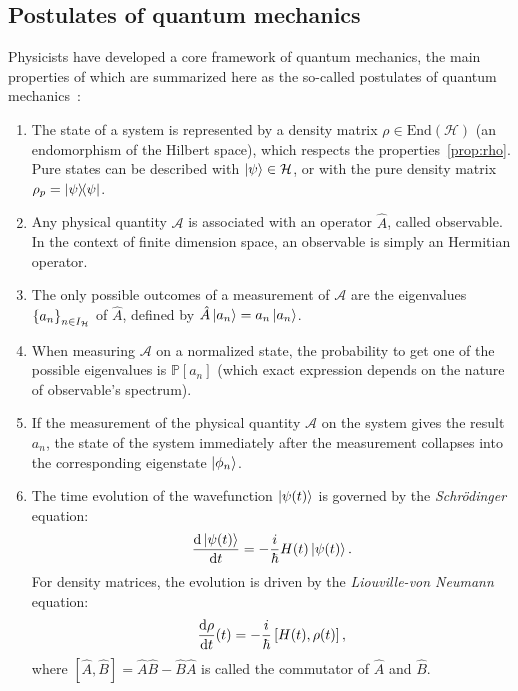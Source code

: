 \subsection{Postulates of quantum mechanics}
Physicists have developed a core framework of quantum mechanics, the main properties of which are summarized here as the so-called postulates of quantum mechanics~\cite{CT}:
\begin{enumerate}
    \item The state of a system is represented by a density matrix $\rho\in\mathrm{End}(\mathcal{H})$ (an endomorphism of the Hilbert space), which respects the properties~\ref{prop:rho}. Pure states can be described with $\ket{\psi}\in\mathcal{H}$, or with the pure density matrix $\rho_p=\ketbra{\psi}{\psi}$. 
    \item Any physical quantity $\mathcal{A}$ is associated with an operator $\hat{A}$, called observable. In the context of finite dimension space, an observable is simply an Hermitian operator.
    \item The only possible outcomes of a measurement of $\mathcal{A}$ are the eigenvalues $\qty{a_n}_{{n\in{I_\mathcal{H}}}}$ of $\hat{A}$, defined by $\hat{A}\ket{a_n}=a_n\ket{a_n}$\label{pstlt:3}.
    \item When measuring $\mathcal{A}$ on a normalized state, the probability to get one of the possible eigenvalues is $\mathbb{P}[a_n]$ (which exact expression depends on the nature of observable's spectrum).
    \item If the measurement of the physical quantity $\mathcal{A}$ on the system gives the result $a_n$, the state of the system immediately after the measurement collapses into the corresponding eigenstate $\ket{\phi_n}$.
    \item The time evolution of the wavefunction $\ket{\psi(t)}$ is governed by the \textit{Schrödinger} equation:
    \begin{equation}
    \frac{\mathrm{d}\ket{\psi(t)}}{\mathrm{d} t}=-\frac{i}{\hbar}H(t)\ket{\psi(t)}.
    \end{equation}
    For density matrices, the evolution is driven by the \textit{Liouville-von Neumann} equation:
    \begin{equation}\label{eq:Liouville}
        \frac{\mathrm{d}\rho}{\mathrm{d}t}(t) = -\frac{i}{\hbar}\left[ H(t),\rho(t)\right],
    \end{equation}
    where $[\hat{A},\hat{B}]=\hat{A}\hat{B}-\hat{B}\hat{A}$ is called the commutator of $\hat{A}$ and $\hat{B}$.
\end{enumerate}


